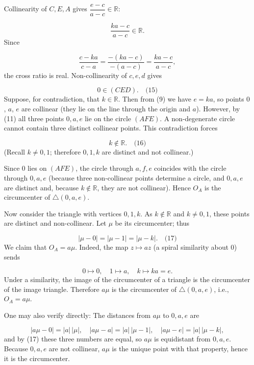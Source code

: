Collinearity of \(C,E,A\) gives \(\dfrac{e - c}{a - c} \in \mathbb{R}\):\par
\[
\frac{k a - c}{a - c} \in \mathbb{R}.
\]
Since\par
\[
\frac{c - k a}{c - a} = \frac{-(k a - c)}{-(a - c)} = \frac{k a - c}{a - c},
\]
the cross ratio is real. Non-collinearity of \(c,e,d\) gives\par
\[
0 \in (CED). \quad\text{(15)}
\]
\smallskip
{}
Suppose, for contradiction, that \(k \in \mathbb{R}\). Then from (9) we have \(e = k a\), so points \(0\), \(a\), \(e\) are collinear (they lie on the line through the origin and \(a\)). However, by (11) all three points \(0,a,e\) lie on the circle \((AFE)\). A non-degenerate circle cannot contain three distinct collinear points. This contradiction forces\par
\[
k \notin \mathbb{R}. \quad\text{(16)}
\]
(Recall \(k \neq 0,1\); therefore \(0,1,k\) are distinct and not collinear.)\par
\smallskip
{}
Since \(0\) lies on \((AFE)\), the circle through \(a,f,e\) coincides with the circle through \(0,a,e\) (because three non-collinear points determine a circle, and \(0,a,e\) are distinct and, because \(k \notin \mathbb{R}\), they are not collinear). Hence \(O_A\) is the circumcenter of \(\triangle (0,a,e)\).\par
Now consider the triangle with vertices \(0,1,k\). As \(k \notin \mathbb{R}\) and \(k \neq 0,1\), these points are distinct and non-collinear. Let \(\mu\) be its circumcenter; thus\par
\[
|\mu - 0| = |\mu - 1| = |\mu - k|. \quad\text{(17)}
\]
We claim that \(O_A = a \mu\). Indeed, the map \(z \mapsto a z\) (a spiral similarity about \(0\)) sends\par
\[
0 \mapsto 0,\quad 1 \mapsto a,\quad k \mapsto k a = e.
\]
Under a similarity, the image of the circumcenter of a triangle is the circumcenter of the image triangle. Therefore \(a \mu\) is the circumcenter of \(\triangle (0,a,e)\), i.e., \(O_A = a \mu\).\par
One may also verify directly: The distances from \(a\mu\) to \(0,a,e\) are\par
\[
|a\mu - 0| = |a|\,|\mu|,\quad |a\mu - a| = |a|\,|\mu - 1|,\quad |a\mu - e| = |a|\,|\mu - k|,
\]
and by (17) these three numbers are equal, so \(a\mu\) is equidistant from \(0,a,e\). Because \(0,a,e\) are not collinear, \(a\mu\) is the unique point with that property, hence it is the circumcenter.\par

